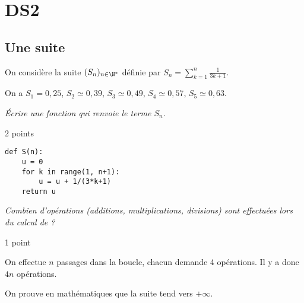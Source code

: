 \chapter{DS2}
\thispagestyle{empty}
\section{Une suite}
On considère la suite $(S_n)_{n\in \N^*}$ définie par $\displaystyle S_n = \sum_{k=1}^n \frac 1{3k+1}$.

On a $S_1 = 0,25$, $S_2 \simeq 0,39$, $S_3 \simeq 0,49$, $S_4 \simeq 0,57$, $S_5 \simeq 0,63$.
\begin{Exercise}\it
Écrire une fonction  qui renvoie le terme $S_n$.
\end{Exercise}
\begin{Answer}2 points
\begin{lstlisting}
def S(n):
    u = 0
    for k in range(1, n+1):
        u = u + 1/(3*k+1)
    return u
\end{lstlisting}
\end{Answer}
\begin{Exercise}\it
Combien d'opérations (additions, multiplications, divisions) sont effectuées lors du calcul de  ?
\end{Exercise}
\begin{Answer}1 point

On effectue $n$ passages dans la boucle, chacun demande 4 opérations.
Il y a donc $4n$ opérations.
\end{Answer}
On prouve en mathématiques que la suite tend vers $+\infty$.

